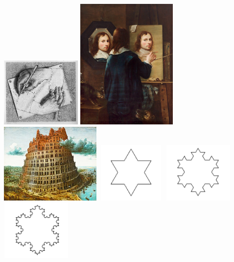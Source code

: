 \documentclass[11pt]{book}
\begin{document}
\includegraphics[width=0.3\textwidth]{./DrawingHands.jpg}
\clearpage%
\includegraphics[width=5.0cm]{./gumpp.jpeg}
\clearpage%
\includegraphics[width=5.0cm]{./bruegel.jpg}
\clearpage%
\includegraphics[width=3.5cm, height=3cm]{./flocon1.pdf}
\clearpage%
\includegraphics[width=3.5cm, height=3cm]{./flocon2.pdf}
\clearpage%
\includegraphics[width=3.5cm, height=3cm]{./flocon3.pdf}
\end{document}
